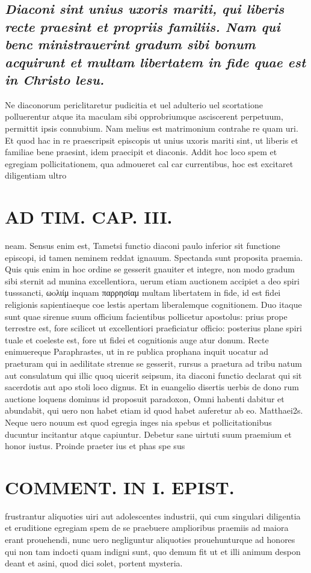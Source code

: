 \documentclass{article}
\begin{document}
\begin{pages}
\subsection*{\textit{Diaconi sint unius uxoris mariti, qui liberis recte praesint et propriis familiis. Nam qui benc ministrauerint gradum sibi bonum acquirunt et multam libertatem in fide quae est in Christo lesu. }}\pstart Ne diaconorum periclitaretur pudicitia et uel adulterio uel scortatione polluerentur atque ita maculam sibi opprobriumque asciscerent perpetuum, permittit ipsis connubium. Nam melius est matrimonium contrahe re quam uri. Et quod hac in re praescripsit episcopis ut unius uxoris mariti sint, ut liberis et familiae bene praesint, idem praecipit et diaconis. Addit hoc loco spem et egregiam pollicitationem, qua admoueret cal car currentibus, hoc est excitaret diligentiam ultro\pend
\section*{AD TIM. CAP. III. }
\marginpar{[ p.133 ]}\pstart neam. Sensus enim est, Tametsi functio diaconi paulo inferior sit functione episcopi, id tamen neminem reddat ignauum. Spectanda sunt proposita praemia. Quis quis enim in hoc ordine se gesserit gnauiter et integre, non modo gradum sibi sternit ad munina excellentiora, uerum etiam auctionem accipiet a deo spiri tusssancti, ωoλιίμ inquam παρρησίαμ multam libertatem in fide, id est fidei religionis sapientiaeque coe lestis apertam liberalemque cognitionem. Duo itaque sunt quae sirenue suum officium facientibus pollicetur apostolus: prius prope terrestre est, fore scilicet ut excellentiori praeficiatur officio: posterius plane spiri tuale et coeleste est, fore ut fidei et cognitionis auge atur donum. Recte enimuereque Paraphrastes, ut in re publica prophana inquit uocatur ad praeturam qui in aedilitate strenue se gesserit, rursus a praetura ad tribu natum aut consulatum qui illic quoq uicerit seipsum, ita diaconi functio declarat qui sit sacerdotis aut apo stoli loco dignus. Et in euangelio disertis uerbis de dono rum auctione loquens dominus id proposuit paradoxon, Omni habenti dabitur et abundabit, qui uero non habet etiam id quod habet auferetur ab eo. Matthaei2s. Neque uero nouum est quod egregia inges nia spebus et pollicitationibus ducuntur incitantur atque capiuntur. Debetur sane uirtuti suum praemium et honor iustus. Proinde praeter ius et phas spe sus  \pend
\section*{COMMENT. IN I. EPIST. }\pstart frustrantur aliquoties uiri aut adolescentes industrii, qui cum singulari diligentia et eruditione egregiam spem de se praebuere amplioribus praemiis ad maiora erant prouehendi, nunc uero negliguntur aliquoties prouehunturque ad honores qui non tam indocti quam indigni sunt, quo demum fit ut et illi animum despon deant et asini, quod dici solet, portent mysteria.  \pend
{}
{}

\end{pages}
\end{document}
